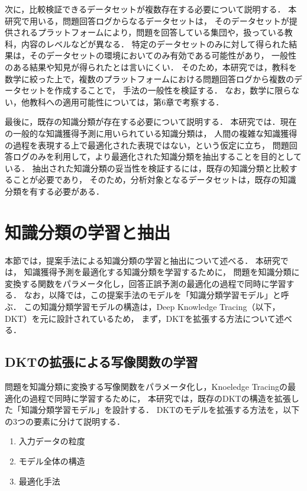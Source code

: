 次に，比較検証できるデータセットが複数存在する必要について説明する．
本研究で用いる，問題回答ログからなるデータセットは，
そのデータセットが提供されるプラットフォームにより，問題を回答している集団や，扱っている教科，内容のレベルなどが異なる．
特定のデータセットのみに対して得られた結果は，そのデータセットの環境においてのみ有効である可能性があり，
一般性のある結果や知見が得られたとは言いにくい．
そのため，本研究では，教科を数学に絞った上で，複数のプラットフォームにおける問題回答ログから複数のデータセットを作成することで，
手法の一般性を検証する．
なお，数学に限らない，他教科への適用可能性については，第6章で考察する．


最後に，既存の知識分類が存在する必要について説明する．
本研究では．現在の一般的な知識獲得予測に用いられている知識分類は，
人間の複雑な知識獲得の過程を表現する上で最適化された表現ではない，という仮定に立ち，
問題回答ログのみを利用して，より最適化された知識分類を抽出することを目的としている．
抽出された知識分類の妥当性を検証するには，既存の知識分類と比較することが必要であり，
そのため，分析対象となるデータセットは，既存の知識分類を有する必要がある．





\section{知識分類の学習と抽出}
本節では，提案手法による知識分類の学習と抽出について述べる．
本研究では，
知識獲得予測を最適化する知識分類を学習するために，
問題を知識分類に変換する関数をパラメータ化し，回答正誤予測の最適化の過程で同時に学習する．
なお，以降では，この提案手法のモデルを「知識分類学習モデル」と呼ぶ．
この知識分類学習モデルの構造は，Deep Knowledge Tracing（以下，DKT）を元に設計されているため，
まず，DKTを拡張する方法について述べる．



\subsection{DKTの拡張による写像関数の学習}
\label{sec:tag_learn}

問題を知識分類に変換する写像関数をパラメータ化し，Knoeledge Tracingの最適化の過程で同時に学習するために，
本研究では，既存のDKTの構造を拡張した「知識分類学習モデル」を設計する．
DKTのモデルを拡張する方法を，以下の3つの要素に分けて説明する．

\begin{enumerate}
	\item 入力データの粒度
	\item モデル全体の構造
	\item 最適化手法
\end{enumerate}



